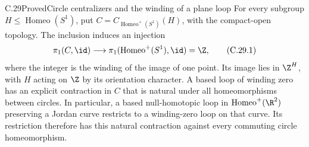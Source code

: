 \begin{claim}{C.29}{Proved}{Circle centralizers and the winding of a plane loop}
For every subgroup $H\leq\operatorname{Homeo}(S^1)$, put
$C=C_{\operatorname{Homeo}^+(S^1)}(H)$, with the compact-open topology.
The inclusion induces an injection
\[
 \pi_1(C,\id)\longrightarrow
 \pi_1(\operatorname{Homeo}^+(S^1),\id)=\Z,              \tag{C.29.1}
\]
where the integer is the winding of the image of one point. Its image
lies in $\Z^H$, with $H$ acting on $\Z$ by its orientation character.
A based loop of winding zero has an explicit contraction in $C$ that
is natural under all homeomorphisms between circles.
In particular, a based null-homotopic loop in
$\operatorname{Homeo}^+(\R^2)$ preserving a Jordan curve restricts to
a winding-zero loop on that curve. Its restriction therefore has this
natural contraction against every commuting circle homeomorphism.
\end{claim}
